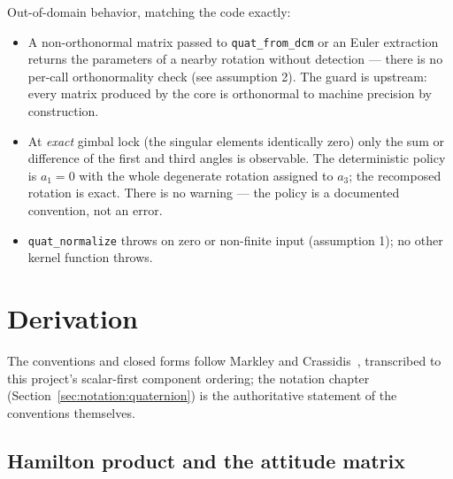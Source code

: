 Out-of-domain behavior, matching the code exactly:
\begin{itemize}
  \item A non-orthonormal matrix passed to \texttt{quat\_from\_dcm} or an
    Euler extraction returns the parameters of a nearby rotation without
    detection --- there is no per-call orthonormality check (see
    assumption 2). The guard is upstream: every matrix produced by the
    core is orthonormal to machine precision by construction.
  \item At \emph{exact} gimbal lock (the singular elements identically
    zero) only the sum or difference of the first and third angles is
    observable. The deterministic policy is $a_1 = 0$ with the whole
    degenerate rotation assigned to $a_3$; the recomposed rotation is
    exact. There is no warning --- the policy is a documented convention,
    not an error.
  \item \texttt{quat\_normalize} throws on zero or non-finite input
    (assumption 1); no other kernel function throws.
\end{itemize}

\section{Derivation}
\label{sec:rotations:derivation}

The conventions and closed forms follow Markley and
Crassidis~\cite{markley2014}, transcribed to this project's scalar-first
component ordering; the notation chapter
(Section~\ref{sec:notation:quaternion}) is the authoritative statement of
the conventions themselves.

\subsection{Hamilton product and the attitude matrix}

